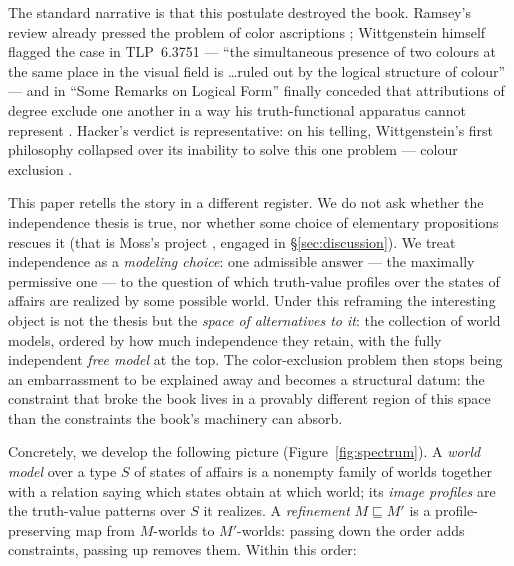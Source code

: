 \documentclass[10pt, letterpaper]{article}
\theoremstyle{remark}
\newcommand{\TLP}[1]{TLP~#1}
\begin{document}
The standard narrative is that this postulate destroyed the book. Ramsey's
review already pressed the problem of color ascriptions
\cite{ramsey1923}; Wittgenstein himself flagged the case in \TLP{6.3751} ---
``the simultaneous presence of two colours at the same place in the visual
field is \ldots ruled out by the logical structure of colour'' --- and in
``Some Remarks on Logical Form'' finally conceded that attributions of degree
exclude one another in a way his truth-functional apparatus cannot represent
\cite{wittgenstein1929}. Hacker's verdict is representative: on his
telling, Wittgenstein's first philosophy collapsed over its inability to
solve this one problem --- colour exclusion \cite{hacker1986}.

This paper retells the story in a different register. We do not ask whether
the independence thesis is true, nor whether some choice of elementary
propositions rescues it (that is Moss's project \cite{moss2012}, engaged in
\S\ref{sec:discussion}). We treat independence as a \emph{modeling choice}: one
admissible answer --- the maximally permissive one --- to the question of which
truth-value profiles over the states of affairs are realized by some possible
world. Under this reframing the interesting object is not the thesis but the
\emph{space of alternatives to it}: the collection of world models, ordered by
how much independence they retain, with the fully independent \emph{free
model} at the top. The color-exclusion problem then stops being an
embarrassment to be explained away and becomes a structural datum: the
constraint that broke the book lives in a provably different region of this
space than the constraints the book's machinery can absorb.

Concretely, we develop the following picture (Figure~\ref{fig:spectrum}). A
\emph{world model} over a type $S$ of states of affairs is a nonempty family
of worlds together with a relation saying which states obtain at which world;
its \emph{image profiles} are the truth-value patterns over $S$ it realizes.
A \emph{refinement} $M \sqsubseteq M'$ is a profile-preserving map from
$M$-worlds to $M'$-worlds: passing down the order adds constraints, passing up
removes them. Within this order:
\end{document}
